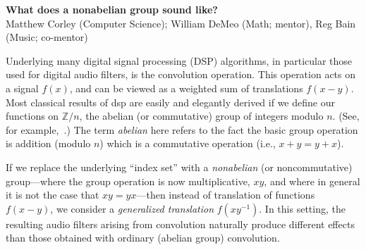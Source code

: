 \documentclass[10pt]{article}
\begin{document}
\begin{center}
{\bf What does a nonabelian group sound like?}\\
Matthew Corley (Computer Science); William DeMeo (Math; mentor), Reg
Bain (Music; co-mentor)
\end{center}

Underlying many digital signal processing (DSP) algorithms, in particular those
used for digital audio filters, is the convolution operation.  This operation
acts on a signal $f(x)$, and can be viewed as a weighted sum of translations
$f(x-y)$. Most classical results of dsp are easily and elegantly derived if we
define our functions on $\mathbb{Z}/n$, the abelian (or commutative) group of
integers modulo $n$. (See, for example,~\cite{Tolimieri:1998}.)
  The term \emph{abelian} here refers to the fact the basic
group operation is addition (modulo $n$) which is a commutative operation (i.e.,
$x+y = y+x$).

If we replace the underlying ``index set'' with a \emph{nonabelian} (or
noncommutative) group---where the group operation is now multiplicative, $xy$,
and where in general it is not the case that $xy = yx$---then instead of
translation of functions $f(x-y)$, we consider a \emph{generalized translation}
$f(xy^{-1})$.  In this setting, the resulting audio filters arising from
convolution naturally produce different effects than those obtained with
ordinary (abelian group) convolution. 
\end{document}
